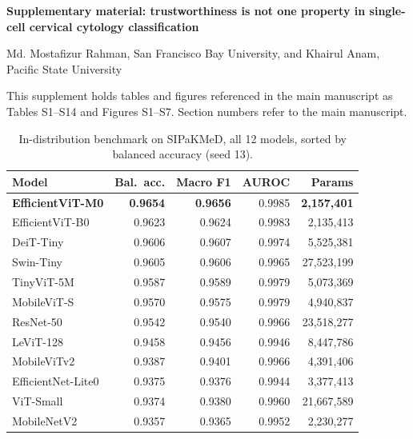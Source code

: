 \documentclass[12pt,letterpaper]{article}
\begin{document}
\begin{center}
{\fontsize{14}{17}\selectfont\bfseries Supplementary material: trustworthiness is not one property in single-cell cervical cytology classification\par}
\vspace{8pt}
{\fontsize{11}{13}\selectfont Md. Mostafizur Rahman, San Francisco Bay University, and Khairul Anam, Pacific State University\par}
\end{center}

\renewcommand{\thetable}{S\arabic{table}}
\renewcommand{\thefigure}{S\arabic{figure}}

This supplement holds tables and figures referenced in the main manuscript as Tables S1--S14 and Figures S1--S7. Section numbers refer to the main manuscript.

\begin{table}[htbp]
\centering
\caption{In-distribution benchmark on SIPaKMeD, all 12 models, sorted by balanced accuracy (seed 13).}
\label{tab:bench}
\begin{tabular}{lrrrr}
\toprule
Model & Bal.\ acc. & Macro F1 & AUROC & Params \\
\midrule
\textbf{EfficientViT-M0} & \textbf{0.9654} & \textbf{0.9656} & 0.9985 & \textbf{2{,}157{,}401} \\
EfficientViT-B0 & 0.9623 & 0.9624 & 0.9983 & 2{,}135{,}413 \\
DeiT-Tiny & 0.9606 & 0.9607 & 0.9974 & 5{,}525{,}381 \\
Swin-Tiny & 0.9605 & 0.9606 & 0.9965 & 27{,}523{,}199 \\
TinyViT-5M & 0.9587 & 0.9589 & 0.9979 & 5{,}073{,}369 \\
MobileViT-S & 0.9570 & 0.9575 & 0.9979 & 4{,}940{,}837 \\
ResNet-50 & 0.9542 & 0.9540 & 0.9966 & 23{,}518{,}277 \\
LeViT-128 & 0.9458 & 0.9456 & 0.9946 & 8{,}447{,}786 \\
MobileViTv2 & 0.9387 & 0.9401 & 0.9966 & 4{,}391{,}406 \\
EfficientNet-Lite0 & 0.9375 & 0.9376 & 0.9944 & 3{,}377{,}413 \\
ViT-Small & 0.9374 & 0.9380 & 0.9960 & 21{,}667{,}589 \\
MobileNetV2 & 0.9357 & 0.9365 & 0.9952 & 2{,}230{,}277 \\
\bottomrule
\end{tabular}
\end{table}
\end{document}

